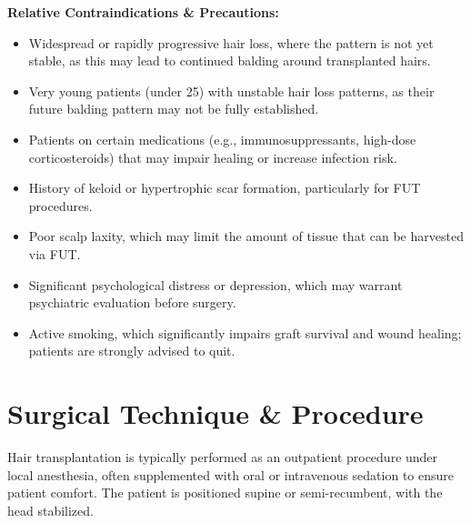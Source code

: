 \textbf{Relative Contraindications \& Precautions:}
\begin{itemize}
  \item Widespread or rapidly progressive hair loss, where the pattern is not yet stable, as this may lead to continued balding around transplanted hairs.
  \item Very young patients (under 25) with unstable hair loss patterns, as their future balding pattern may not be fully established.
  \item Patients on certain medications (e.g., immunosuppressants, high-dose corticosteroids) that may impair healing or increase infection risk.
  \item History of keloid or hypertrophic scar formation, particularly for FUT procedures.
  \item Poor scalp laxity, which may limit the amount of tissue that can be harvested via FUT.
  \item Significant psychological distress or depression, which may warrant psychiatric evaluation before surgery.
  \item Active smoking, which significantly impairs graft survival and wound healing; patients are strongly advised to quit.
\end{itemize}

\section*{Surgical Technique \& Procedure}
Hair transplantation is typically performed as an outpatient procedure under local anesthesia, often supplemented with oral or intravenous sedation to ensure patient comfort. The patient is positioned supine or semi-recumbent, with the head stabilized.

